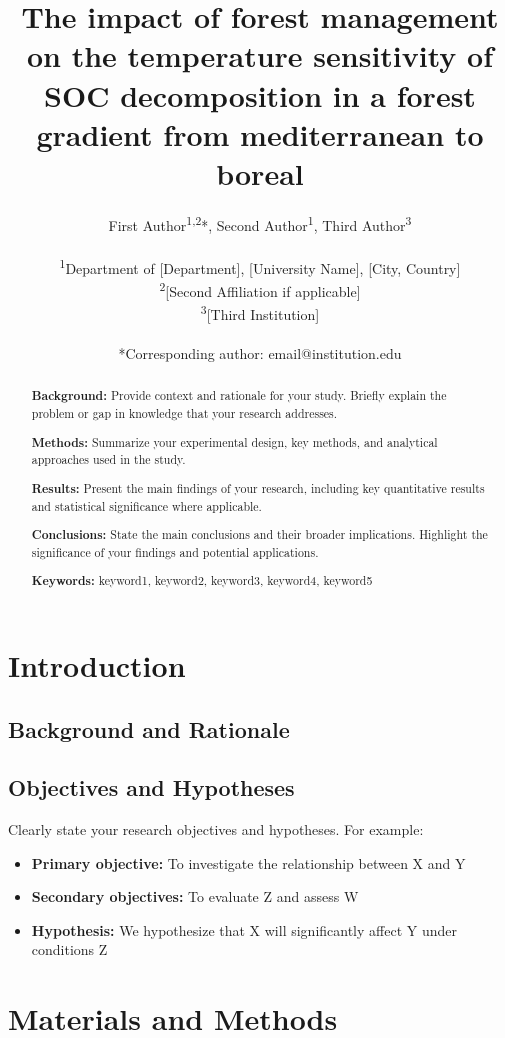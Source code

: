 \documentclass[12pt,a4paper]{article}
\title{\textbf{The impact of forest management on the temperature sensitivity of SOC decomposition in a forest gradient from mediterranean to boreal}}
\author{
    First Author\textsuperscript{1,2}*, 
    Second Author\textsuperscript{1}, 
    Third Author\textsuperscript{3}\\
    \\
    \textsuperscript{1}Department of [Department], [University Name], [City, Country]\\
    \textsuperscript{2}[Second Affiliation if applicable]\\
    \textsuperscript{3}[Third Institution]\\
    \\
    *Corresponding author: email@institution.edu
}
\date{}
\begin{document}
\maketitle

\begin{abstract}
\noindent
\textbf{Background:} Provide context and rationale for your study. Briefly explain the problem or gap in knowledge that your research addresses.

\textbf{Methods:} Summarize your experimental design, key methods, and analytical approaches used in the study.

\textbf{Results:} Present the main findings of your research, including key quantitative results and statistical significance where applicable.

\textbf{Conclusions:} State the main conclusions and their broader implications. Highlight the significance of your findings and potential applications.

\textbf{Keywords:} keyword1, keyword2, keyword3, keyword4, keyword5
\end{abstract}

\newpage

\section{Introduction}


\subsection{Background and Rationale}


\subsection{Objectives and Hypotheses}

Clearly state your research objectives and hypotheses. For example:
\begin{itemize}
    \item \textbf{Primary objective:} To investigate the relationship between X and Y
    \item \textbf{Secondary objectives:} To evaluate Z and assess W
    \item \textbf{Hypothesis:} We hypothesize that X will significantly affect Y under conditions Z
\end{itemize}






\section{Materials and Methods}
\end{document}
